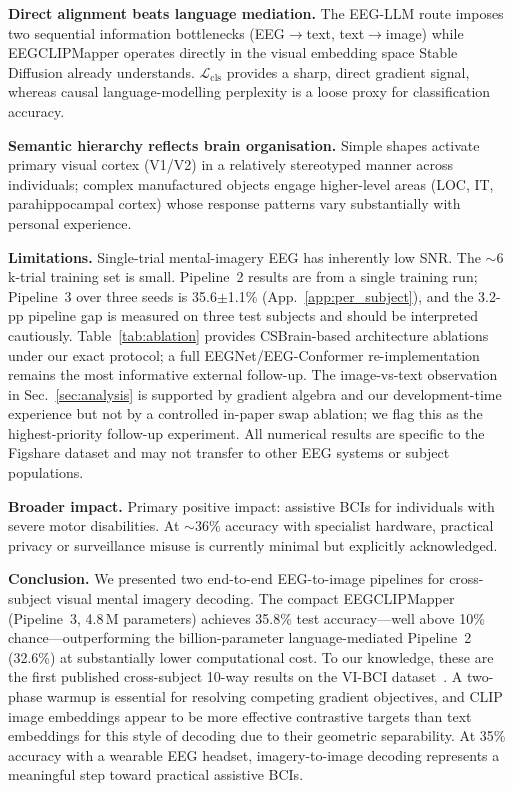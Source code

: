 \documentclass{article}
\begin{document}
\textbf{Direct alignment beats language mediation.} The EEG-LLM route imposes two sequential information bottlenecks (EEG$\to$text, text$\to$image) while EEGCLIPMapper operates directly in the visual embedding space Stable Diffusion already understands. $\mathcal{L}_\mathrm{cls}$ provides a sharp, direct gradient signal, whereas causal language-modelling perplexity is a loose proxy for classification accuracy.

\textbf{Semantic hierarchy reflects brain organisation.} Simple shapes activate primary visual cortex (V1/V2) in a relatively stereotyped manner across individuals; complex manufactured objects engage higher-level areas (LOC, IT, parahippocampal cortex) whose response patterns vary substantially with personal experience.

\textbf{Limitations.} Single-trial mental-imagery EEG has inherently low SNR. The $\sim$6\,k-trial training set is small. Pipeline~2 results are from a single training run; Pipeline~3 over three seeds is 35.6$\pm$1.1\% (App.~\ref{app:per_subject}), and the 3.2-pp pipeline gap is measured on three test subjects and should be interpreted cautiously. Table~\ref{tab:ablation} provides CSBrain-based architecture ablations under our exact protocol; a full EEGNet/EEG-Conformer re-implementation remains the most informative external follow-up. The image-vs-text observation in Sec.~\ref{sec:analysis} is supported by gradient algebra and our development-time experience but not by a controlled in-paper swap ablation; we flag this as the highest-priority follow-up experiment. All numerical results are specific to the Figshare dataset and may not transfer to other EEG systems or subject populations.

\textbf{Broader impact.} Primary positive impact: assistive BCIs for individuals with severe motor disabilities. At $\sim$36\% accuracy with specialist hardware, practical privacy or surveillance misuse is currently minimal but explicitly acknowledged.

\textbf{Conclusion.} We presented two end-to-end EEG-to-image pipelines for cross-subject visual mental imagery decoding. The compact EEGCLIPMapper (Pipeline~3, 4.8\,M parameters) achieves 35.8\% test accuracy---well above 10\% chance---outperforming the billion-parameter language-mediated Pipeline~2 (32.6\%) at substantially lower computational cost. To our knowledge, these are the first published cross-subject 10-way results on the VI-BCI dataset~\citep{figshare_eeg,figshare_paper}. A two-phase warmup is essential for resolving competing gradient objectives, and CLIP image embeddings appear to be more effective contrastive targets than text embeddings for this style of decoding due to their geometric separability. At 35\% accuracy with a wearable EEG headset, imagery-to-image decoding represents a meaningful step toward practical assistive BCIs.
\end{document}
